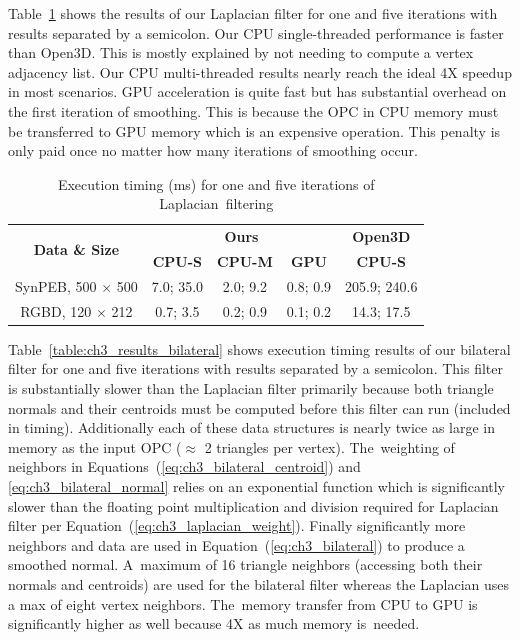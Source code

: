 Table~\ref{table:ch3_results_lapalcian} shows the results of our Laplacian filter for one and five iterations with results separated by a semicolon. Our CPU single-threaded performance is faster than Open3D. This is mostly explained by not needing to compute a vertex adjacency list. Our CPU multi-threaded results nearly reach the ideal 4X speedup in most scenarios. GPU acceleration is quite fast but has substantial overhead on the first iteration of smoothing. This is because the \ac{OPC} in CPU memory must be transferred to \ac{GPU} memory which is an expensive operation. This penalty is only paid once no matter how many iterations of smoothing occur.  
\begin{table}[H]
\centering
\caption{Execution timing (ms) for one and five iterations of Laplacian~filtering}\label{table:ch3_results_lapalcian}

\begin{tabular}{@{}ccccc@{}}
\toprule
   \multirow{2}{*}{\bf Data \& Size}           & \multicolumn{3}{c}{\textbf{Ours}} & \textbf{Open3D} \\
                  \cmidrule(lr){2-5}     
    & \textbf{CPU-S}     & \textbf{CPU-M}     & \textbf{GPU}         & \textbf{CPU-S}  \\ \midrule
SynPEB, 500 $\times$ 500 & 7.0; 35.0  & 2.0; 9.2   & 0.8; 0.9    & 205.9; 240.6  \\
RGBD, 120 $\times$ 212   & 0.7; 3.5  & 0.2; 0.9   & 0.1; 0.2    & 14.3; 17.5   \\ \bottomrule
\end{tabular}
\end{table}


Table~\ref{table:ch3_results_bilateral} shows execution timing results of our bilateral filter for one and five iterations with results separated by a semicolon. This filter is substantially slower than the Laplacian filter primarily because both triangle normals and their centroids must be computed before this filter can run (included in timing). Additionally each of these data structures is nearly twice as large in memory as the input \ac{OPC} ($\approx$ 2 triangles per vertex). The~weighting of neighbors in Equations~(\ref{eq:ch3_bilateral_centroid}) and \ref{eq:ch3_bilateral_normal} relies on an exponential function which is significantly slower than the floating point multiplication and division required for Laplacian filter per Equation~(\ref{eq:ch3_laplacian_weight}). Finally significantly more neighbors and data are used in Equation~(\ref{eq:ch3_bilateral}) to produce a smoothed normal. A~maximum of 16 triangle neighbors (accessing both their normals and centroids) are used for the bilateral filter whereas the Laplacian uses a max of eight vertex neighbors. The~memory transfer from CPU to \ac{GPU} is significantly higher as well because 4X as much memory is~needed.

